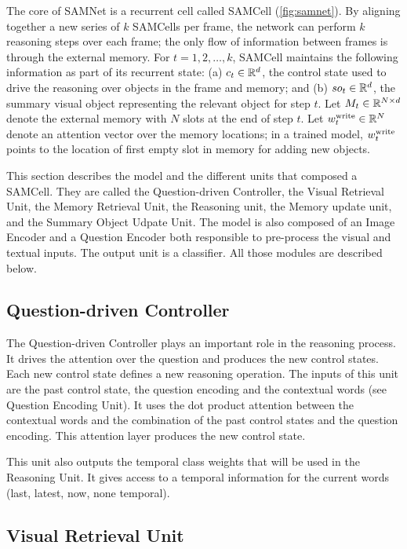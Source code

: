 The core of SAMNet is a recurrent cell called SAMCell (\cref{fig:samnet}). 
By aligning together a new series of $k$ SAMCells per frame, the network can perform $k$ 
reasoning steps over each frame; the only flow of information between frames is through the external memory. 
For $t=1,2, \dots, k$, SAMCell maintains the following information as part of its recurrent state:
(a) $c_t \in \mathbb{R}^d$, the control state used to drive the reasoning over objects in the frame and memory; and
(b) $so_t  \in \mathbb{R}^d$, the summary visual object representing the relevant object for step $t$.
Let $M_t \in  \mathbb{R}^{N \times d}$ denote the external memory with $N$ slots at the end of step $t$.
Let $w^{\mathrm{write}}_t \in  \mathbb{R}^N$ denote an attention vector over the memory locations;
in a trained model, $w^{\mathrm{write}}_t$ points to the location of first empty slot in memory for adding new objects.   

This section describes the model and the different units that composed a SAMCell. They are called the Question-driven Controller, the Visual Retrieval Unit, the Memory Retrieval Unit, the Reasoning unit, the Memory update unit, and the Summary Object Udpate Unit. 
The model is also composed of an Image Encoder and a Question Encoder both responsible to pre-process the visual and textual inputs. The output unit is a classifier.
All those modules are described below.


\subsection{Question-driven Controller}

The Question-driven Controller plays an important role in the reasoning process.
It drives the attention over the question and produces the new control states. Each new control state defines a new reasoning operation. The inputs of this unit are the past control state, the question encoding and the contextual words (see Question Encoding Unit). It uses the dot product attention between the contextual words
and the combination of the past control states and the question encoding.  This attention layer produces the new control state.

This unit also outputs the temporal class weights that will be used in the Reasoning Unit. It gives access to a temporal information for the current words (last, latest, now, none temporal).

\subsection{Visual Retrieval Unit}

